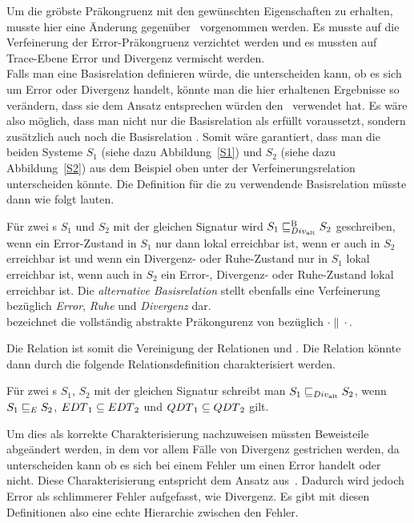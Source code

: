 Um die gröbste Präkongruenz mit den gewünschten Eigenschaften zu erhalten,
musste hier eine Änderung gegenüber~\cite{Chilton2013} vorgenommen werden. Es
musste auf die Verfeinerung der Error-Präkongruenz verzichtet werden und es
mussten auf Trace-Ebene Error und Divergenz vermischt werden.\\
Falls man eine Basisrelation definieren würde, die unterscheiden kann, ob es
sich um Error oder Divergenz handelt, könnte man die hier erhaltenen
Ergebnisse so verändern, dass sie dem Ansatz entsprechen würden
den~\cite{Chilton2013} verwendet hat. Es wäre also möglich, dass man nicht nur
die Basisrelation \DBRel{} als erfüllt voraussetzt, sondern zusätzlich auch
noch die Basisrelation \EBRel{}. Somit wäre garantiert, dass man die beiden
Systeme $S_1$ (siehe dazu Abbildung~\ref{S1}) und $S_2$ (siehe dazu
Abbildung~\ref{S2}) aus dem Beispiel oben unter der Verfeinerungsrelation
unterscheiden könnte. Die Definition für die zu verwendende Basisrelation
müsste dann wie folgt lauten.

\begin{Def}
  Für zwei \EIO{}s $S_1$ und $S_2$ mit der gleichen Signatur wird $S_1\sqsubseteq _{Div_{\mathrm{alt}}}^\mathrm{B}{}
  S_2$ geschreiben, wenn ein Error-Zustand in $S_1$ nur dann lokal erreichbar
  ist, wenn er auch in $S_2$ erreichbar ist und wenn ein Divergenz- oder
  Ruhe-Zustand nur in $S_1$ lokal erreichbar ist, wenn auch in $S_2$ ein
  Error-, Divergenz- oder Ruhe-Zustand lokal erreichbar ist. Die
  \emph{alternative Basisrelation} stellt ebenfalls eine Verfeinerung bezüglich
  \emph{Error}, \emph{Ruhe} und \emph{Divergenz} dar.\\
  \DCaRel{} bezeichnet die vollständig abstrakte Präkongurenz von \DBaRel{}
  bezüglich $\cdot\|\cdot$.
\end{Def}

Die Relation \DBaRel{} ist somit die Vereinigung der Relationen \EBRel{} und
\DBRel{}. Die Relation \DCaRel{} könnte dann durch die folgende
Relationsdefinition charakterisiert werden.

\begin{Def}
  Für zwei \EIO{}s $S_1$, $S_2$ mit der gleichen Signatur schreibt man
  $S_1\sqsubseteq _{Div_{\mathrm{alt}}}{} S_2$, wenn $S_1 \sqsubseteq _E{} S_2$, $EDT{}_1\subseteq
  EDT{}_2$ und $QDT{}_1\subseteq QDT{}_2$ gilt.
\end{Def}

Um dies als korrekte Charakterisierung nachzuweisen müssten Beweisteile
abgeändert werden, in dem vor allem Fälle von Divergenz gestrichen werden, da
\DBaRel{} unterscheiden kann ob es sich bei einem Fehler um einen Error handelt
oder nicht. Diese Charakterisierung \DaRel{} entspricht dem Ansatz
aus~\cite{Chilton2013}. Dadurch wird jedoch Error als \glqq{}schlimmerer
Fehler\grqq{} aufgefasst, wie Divergenz. Es gibt mit diesen Definitionen also
eine echte Hierarchie zwischen den Fehler.

